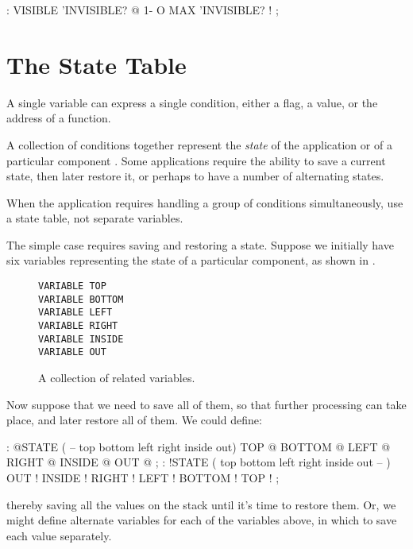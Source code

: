 \begin{Code}
: VISIBLE   'INVISIBLE? @  1-  O MAX  'INVISIBLE? ! ;
\end{Code}
%

\section{The State Table}%

A single variable can express a single condition, either a flag, a value, or
the address of a function.

A collection of conditions together represent the \emph{state} of the
application or of a particular component \cite{slater83}. Some applications require the
ability to save a current state, then later restore it, or perhaps to have a
number of alternating states.

\begin{tip}
When the application requires handling a group of conditions
simultaneously, use a state table, not separate variables.
\end{tip}

\noindent The simple case requires saving and restoring a state. Suppose
we initially have six variables representing the state of a particular
component, as shown in .
\begin{figure*}[hhhh]
\caption{A collection of related variables.}
\begin{center}
\begin{BVerbatim}
VARIABLE TOP
VARIABLE BOTTOM
VARIABLE LEFT
VARIABLE RIGHT
VARIABLE INSIDE
VARIABLE OUT
\end{BVerbatim}
\end{center}
\end{figure*}

\noindent Now suppose that we need to save all of them, so that further
processing can take place, and later restore all of them. We could define:

\begin{Code}
: @STATE ( -- top bottom left right inside out)
   TOP @  BOTTOM @  LEFT @  RIGHT @  INSIDE @  OUT @ ;
: !STATE ( top bottom left right inside out -- )
   OUT !  INSIDE !  RIGHT !  LEFT !  BOTTOM !  TOP ! ;
\end{Code}
thereby saving all the values on the stack until it's time to restore them.
Or, we might define alternate variables for each of the variables above, in
which to save each value separately.

